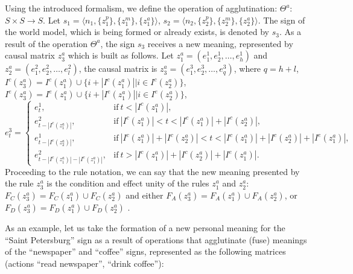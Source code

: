 \documentclass[12pt]{scrartcl}
\begin{document}
	Using the introduced formalism, we define the operation of agglutination: $\Theta^a$: $S\times S\rightarrow S$. Let $s_1=\langle n_1, \{z_1^p\}, \{z_1^m\}, \{z_1^a\} \rangle$, $s_2=\langle n_2, \{z_2^p\}, \{z_2^m\}, \{z_2^a\} \rangle$. The sign of the world model, which is being formed or already exists, is denoted by $s_3$. As a result of the operation $\Theta^a$, the sign $s_3$ receives a new meaning, represented by causal matrix $z_3^a$ which is built as follows. Let $z_1^a=(e_1^1, e_2^1,\dots,e_h^1)$ and $z_2^a=(e_1^2, e_2^2,\dots,e_l^2)$, the causal matrix is $z_3^a=(e_1^3, e_2^3,\dots,e_q^3)$, where $q=h+l$, $I^c(z_3^a)=I^c(z_1^a)\cup \{i+|I^c(z_1^a)||i\in I^c(z_2^a)\}$, $I^e(z_3^a)=I^e(z_1^a)\cup \{i+|I^e(z_1^a)||i\in I^e(z_2^a)\}$,
	\[
	e_t^3=\begin{cases}
	e_t^1, &\text{if}\ t<|I^c(z_1^a)|,\\
	e_{t-|I^c(z_1^a)|}^2, &\text{if}\ |I^c(z_1^a)|<t<|I^c(z_1^a)|+|I^c(z_2^a)|,\\
	e_{t-|I^c(z_2^a)|}^1, &\text{if}\ |I^c(z_1^a)|+|I^c(z_2^a)|<t<|I^c(z_1^a)|+|I^c(z_2^a)|+|I^e(z_1^a)|,\\
	e_{t-|I^c(z_1^a)|-|I^e(z_1^a)|}^2, &\text{if}\ t>|I^c(z_1^a)|+|I^c(z_2^a)|+|I^e(z_1^a)|.
	\end{cases}
	\]
	Proceeding to the rule notation, we can say that the new meaning presented by the rule $z_3^a$ is the condition and effect unity of the rules $z_1^a$ and $z_2^a$: $F_C(z_3^a)=F_C(z_1^a)\cup F_C(z_2^a)$ and either $F_A(z_3^a)=F_A(z_1^a)\cup F_A(z_2^a)$, or $F_D(z_3^a)=F_D(z_1^a)\cup F_D(z_2^a)$ \cite{Osipov2016a}.
	
	As an example, let us take the formation of a new personal meaning for the ``Saint Petersburg'' sign as a result of operations that  agglutinate (fuse) meanings of the ``newspaper'' and ``coffee'' signs, represented as the following matrices (actions ``read newspaper'', ``drink coffee''):
	
\end{document}
